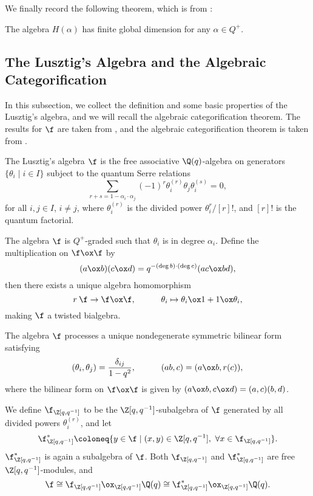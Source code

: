 We finally record the following theorem, which is from \cite[Corollary 2.9]{K}:

\begin{theorem}
    The algebra $H(\alpha)$ has finite global dimension for any $\alpha\in Q^+$.
\end{theorem}

\subsection{The Lusztig's Algebra and the Algebraic Categorification}

In this subsection, we collect the definition and some basic properties of the Lusztig's algebra,
and we will recall the algebraic categorification theorem. The results for 
$\f$ are taken from \cite{L}, and the algebraic categorification theorem
is taken from \cite{KL1}.

\begin{definition}
    The Lusztig's algebra $\f$ is the free associative $\Q(q)$-algebra
    on generators $\{\theta_{i}\mid i\in I\}$ subject to the quantum Serre relations
    \[
        \sum_{r+s = 1-\alpha_i\cdot\alpha_j}(-1)^r\theta_i^{(r)}\theta_j\theta_i^{(s)} = 0,
    \]
    for all $i,j\in I$, $i\ne j$, where $\theta_i^{(r)}$ is the divided power
    $\theta_i^r/[r]!$, and $[r]!$ is the quantum factorial.
\end{definition}

The algebra $\f$ is $Q^+$-graded such that $\theta_i$ is in degree $\alpha_i$.
Define the multiplication on $\f\ox\f$ by $$(a\ox b)(c\ox d)
 = q^{-(\deg b)\cdot(\deg c)}(ac\ox bd),$$ then there exists a unique algebra
homomorphism $$r\:\f\to\f\ox\f,\hspace{3em}\theta_i\mapsto\theta_i\ox 1
+1\ox \theta_i,$$ making $\f$ a twisted bialgebra.

The algebra $\f$ processes a unique nondegenerate symmetric bilinear form satisfying
\[
    (\theta_i,\theta_j) = \dfrac{\delta_{ij}}{1-q^2},\hspace{3em}
    (ab,c) = (a\ox b,r(c)),
\] 
where the bilinear form on $\f\ox \f$ is given by 
$(a\ox b,c\ox d) = (a,c)(b,d)$.

We define $\f_{\Z[q,q^{-1}]}$ to be the $\Z[q,q^{-1}]$-subalgebra of $\f$
generated by all divided powers $\theta_i^{(r)}$, and let 
\[
    \f_{\Z[q,q^{-1}]}^* \coloneq  \{y\in\f\mid (x,y)\in\Z[q,q^{-1}],\ 
    \forall x\in\f_{\Z[q,q^{-1}]}\}.
\]
$\f_{\Z[q,q^{-1}]}^*$ is again a subalgebra
of $\f$. Both $\f_{\Z[q,q^{-1}]}$ and $\f_{\Z[q,q^{-1}]}^*$ are free
$\Z[q,q^{-1}]$-modules, and $$\f\cong\f_{\Z[q,q^{-1}]}\ox_{\Z[q,q^{-1}]}\Q(q)
\cong\f_{\Z[q,q^{-1}]}^*\ox_{\Z[q,q^{-1}]}\Q(q).$$

